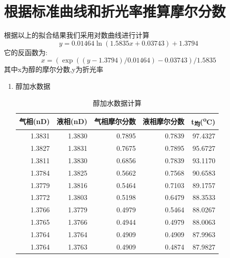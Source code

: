 \documentclass[11pt]{report}
\begin{document}
\section{根据标准曲线和折光率推算摩尔分数}
\label{sec:org40314a3}
根据以上的拟合结果我们采用对数曲线进行计算
\[
    y=0.01464\ln(1.5835x+0.03743)+1.3794
    \]
它的反函数为:
\[
    x=(\exp((y-1.3794)/0.01464)-0.03743)/1.5835
    \]
其中x为醇的摩尔分数,y为折光率
\begin{enumerate}
\item 醇加水数据
\label{sec:orgb7b6432}
\begin{table}[htbp]
\caption{\label{tab:org962982a}醇加水数据计算}
\centering
\begin{tabular}{rrrrr}
气相(nD) & 液相(nD) & 气相摩尔分数 & 液相摩尔分数 & t\textsubscript{均}(\textsuperscript{o}C)\\
\hline
1.3831 & 1.3830 & 0.7895 & 0.7839 & 97.4327\\
1.3827 & 1.3831 & 0.7675 & 0.7895 & 95.6727\\
1.3811 & 1.3830 & 0.6856 & 0.7839 & 93.1170\\
1.3784 & 1.3825 & 0.5662 & 0.7568 & 90.6583\\
1.3779 & 1.3816 & 0.5464 & 0.7103 & 89.1757\\
1.3772 & 1.3803 & 0.5198 & 0.6479 & 88.3533\\
1.3766 & 1.3779 & 0.4979 & 0.5464 & 88.0267\\
1.3765 & 1.3766 & 0.4944 & 0.4979 & 88.0063\\
1.3764 & 1.3764 & 0.4909 & 0.4909 & 87.9963\\
1.3764 & 1.3763 & 0.4909 & 0.4874 & 87.9827\\
\end{tabular}
\end{table}


\end{enumerate}
\end{document}
